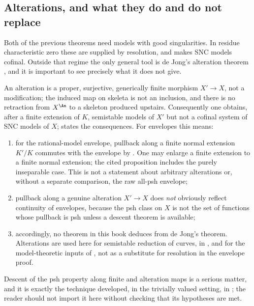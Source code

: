 \subsection{Alterations, and what they do and do not replace}
\label{sec:ch23-later-alterations}

Both of the previous theorems need models with good singularities.  In
residue characteristic zero these are supplied by resolution, and
 makes SNC models cofinal.  Outside that regime the
only general tool is de Jong's alteration theorem
, and it is important to see precisely what it does
not give.

An alteration is a proper, surjective, generically finite morphism
\(X'\to X\), not a modification; the induced map on skeleta is not an
inclusion, and there is no retraction from \(X^{\An}\) to a skeleton
produced upstairs.  Consequently one obtains, after a finite extension of
\(K\), semistable models of \(X'\) but not a cofinal system of SNC models of
\(X\);  states the consequences.  For envelopes
this means:
\begin{enumerate}
\item for the rational-model envelope, pullback along a finite normal
extension \(K'/K\) commutes with the envelope by
\cite[Proposition~2.11]{GJKM19}.  One may enlarge a finite extension to
a finite normal extension; the cited proposition includes the purely
inseparable case.  This is not a statement about arbitrary alterations or,
without a separate comparison, the raw all-psh envelope;
\item pullback along a genuine alteration \(X'\to X\) does \emph{not}
obviously reflect continuity of envelopes, because the psh class on \(X\) is
not the set of functions whose pullback is psh unless a descent theorem is
available;
\item accordingly, no theorem in this book deduces
 from de Jong's theorem.  Alterations are
used here for semistable reduction of curves, in
, and for the model-theoretic
inputs of , not as a substitute for resolution in the
envelope proof.
\end{enumerate}
Descent of the psh property along finite and alteration maps is a serious
matter, and it is exactly the technique developed, in the trivially valued
setting, in ; the reader should not import it here
without checking that its hypotheses are met.

